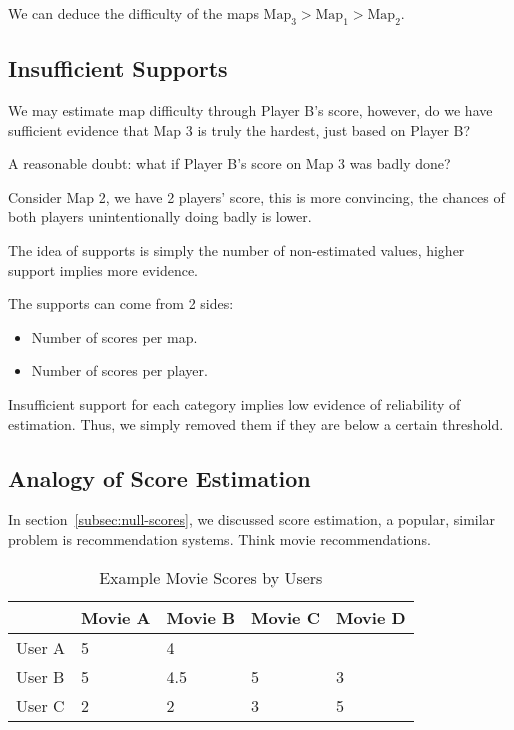 We can deduce the difficulty of the maps $\text{Map}_3 > \text{Map}_1 > \text{Map}_2$.

\subsection{Insufficient Supports}

We may estimate map difficulty through Player B's score, however, do we have sufficient evidence that
Map 3 is truly the hardest, just based on Player B?

A reasonable doubt: what if Player B's score on Map 3 was badly done?

Consider Map 2, we have 2 players' score, this is more convincing, the chances of both players unintentionally
doing badly is lower.

The idea of supports is simply the number of non-estimated values, higher support implies more evidence.

The supports can come from 2 sides:

\begin{itemize}
    \item Number of scores per map.
    \item Number of scores per player.
\end{itemize}

Insufficient support for each category implies low evidence of reliability of estimation.
Thus, we simply removed them if they are below a certain threshold.

\subsection{Analogy of Score Estimation}

In section~\ref{subsec:null-scores}, we discussed score estimation, a popular, similar problem is
recommendation systems.
Think movie recommendations.

\begin{table}[H]
    \centering
    \begin{tabular}{lllll}
        \toprule
        \textbf{} & \textbf{Movie A} & \textbf{Movie B} & \textbf{Movie C} & \textbf{Movie D} \\
        \midrule
        User A & 5 & 4 &  &  \\
        User B & 5 & 4.5 & 5 & 3  \\
        User C & 2 & 2 & 3 & 5 \\
        \bottomrule
    \end{tabular}
    \caption{Example Movie Scores by Users}
    \label{tab:eg_movie_scores}
\end{table}

